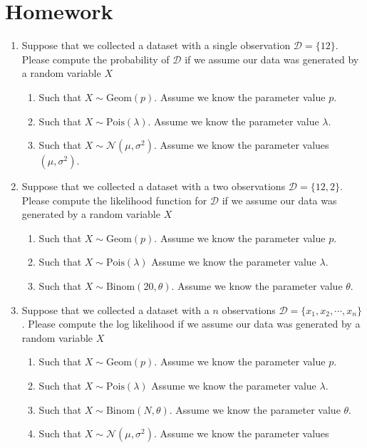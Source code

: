 \section{Homework}

\begin{enumerate}
    \item Suppose that we collected a dataset with a single observation $\mathcal{D} = \{ 12 \}$. Please compute the probability of $\mathcal{D}$ if we assume our data was generated by a random variable $X$
    \begin{enumerate}
        \item Such that $X \sim \text{Geom}(p)$. Assume we know the parameter value $p$. 
        \item Such that $X \sim \text{Pois}(\lambda)$. Assume we know the parameter value $\lambda$. 
        \item Such that $X \sim \mathcal{N}(\mu,\sigma^{2})$.
        Assume we know the parameter values $(\mu, \sigma^{2})$.
    \end{enumerate}
    
    \item Suppose that we collected a dataset with a two observations $\mathcal{D} = \{ 12, 2 \}$. Please compute the likelihood function for $\mathcal{D}$ if we assume our data was generated by a random variable $X$
        \begin{enumerate}
        \item Such that $X \sim \text{Geom}(p)$. Assume we know the parameter value $p$. 
        \item Such that $X \sim \text{Pois}(\lambda)$ Assume we know the parameter value $\lambda$. 
        \item Such that $X \sim \text{Binom}(20, \theta)$.
        Assume we know the parameter value $\theta$.
    \end{enumerate}
    
    \item Suppose that we collected a dataset with a $n$ observations $\mathcal{D} = \{ x_{1}, x_{2}, \cdots, x_{n} \}$. Please compute the log likelihood if we assume our data was generated by a random variable $X$
        \begin{enumerate}
        \item Such that $X \sim \text{Geom}(p)$. Assume we know the parameter value $p$. 
        \item Such that $X \sim \text{Pois}(\lambda)$ Assume we know the parameter value $\lambda$. 
        \item Such that $X \sim \text{Binom}(N, \theta)$.
        Assume we know the parameter value $\theta$.
        \item Such that $X \sim \mathcal{N}(\mu,\sigma^{2})$.
        Assume we know the parameter values
    \end{enumerate}
    

\end{enumerate}
